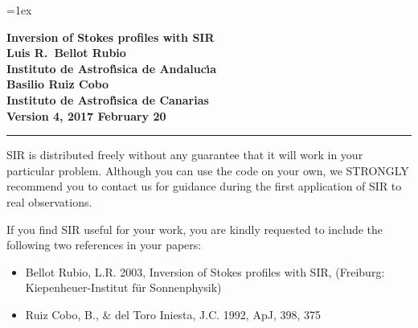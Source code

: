 
\def\d{{\rm d}}
\def\vec#1{\mbox{\boldmath $ #1$}}
\def\tens#1{\ifmmode\mathchoice{\mbox{$\sf\displaystyle#1$}}
{\mbox{$\sf\textstyle#1$}}
{\mbox{$\sf\scriptstyle#1$}}
{\mbox{$\sf\scriptscriptstyle#1$}}\else
\hbox{$\sf\textstyle#1$}\fi}

\renewcommand{\labelenumii}{\theenumii}
\renewcommand{\theenumii}{\theenumi.\arabic{enumii}.}

\oddsidemargin=0.1in
\topmargin=0in
\textheight=21.5cm
\textwidth=15.5cm
\parskip=1ex


 


\thispagestyle{empty}
\vspace*{3cm}
\begin{center}
\Huge \bf Inversion of Stokes profiles with SIR \\
\vspace*{2cm}
\Large Luis R.\ Bellot Rubio \\
Instituto de Astrof\'\i sica de Andaluc\'\i a \\
\vspace*{.5cm}
Basilio Ruiz Cobo \\
Instituto de Astrof\'\i sica de Canarias\\

\vspace*{.5cm}
\normalsize
Version 4, 2017 February 20
\end{center}

\clearpage
\vspace*{\fill}

\hrule
\vspace*{1em}
\noindent SIR is distributed freely without any guarantee that it will work 
in your particular problem. Although you can use the code on your 
own, we STRONGLY recommend you to contact us for guidance during 
the first application of SIR to real observations.

\noindent If you find SIR useful for your work, you are kindly requested
to include the following two references in your papers:

\begin{itemize}
\item Bellot Rubio, L.R. 2003, Inversion of Stokes profiles with SIR, 
  (Freiburg: Kiepenheuer-Institut f\"ur Sonnenphysik)
\item Ruiz Cobo, B., \& del Toro Iniesta, J.C. 1992, ApJ, 398, 375 
\end{itemize}


